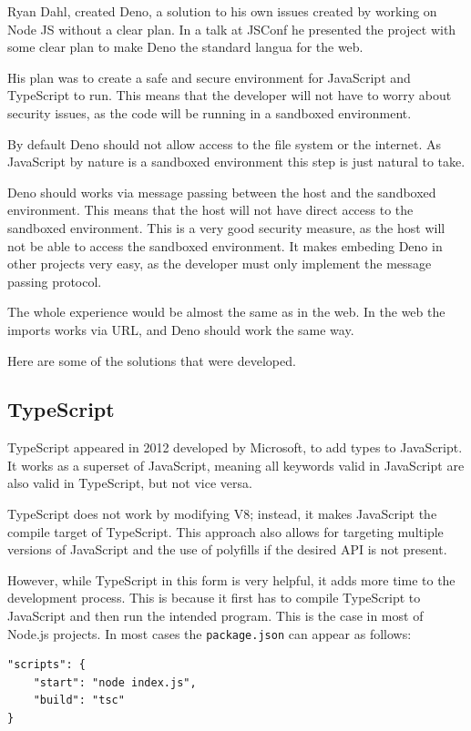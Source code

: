 \documentclass[10pt,journal,compsoc]{IEEEtran}
\begin{document}
Ryan Dahl, created Deno, a solution to his own issues created by working on Node JS without a clear plan. In a talk at JSConf he presented the project with some clear plan to make Deno the standard langua for the web.

His plan was to create a safe and secure environment for JavaScript and TypeScript to run. This means that the developer will not have to worry about security issues, as the code will be running in a sandboxed environment.

By default Deno should not allow access to the file system or the internet. As JavaScript by nature is a sandboxed environment this step is just natural to take.

Deno should works via message passing between the host and the sandboxed environment. This means that the host will not have direct access to the sandboxed environment. This is a very good security measure, as the host will not be able to access the sandboxed environment. It makes embeding Deno in other projects very easy, as the developer must only implement the message passing protocol.

The whole experience would be almost the same as in the web. In the web the imports works via URL, and Deno should work the same way.

Here are some of the solutions that were developed.

\subsection{TypeScript}

TypeScript appeared in 2012 developed by Microsoft, to add types to JavaScript. It works as a superset of JavaScript, meaning all keywords valid in JavaScript are also valid in TypeScript, but not vice versa. \cite{TypeScript}

TypeScript does not work by modifying V8; instead, it makes JavaScript the compile target of TypeScript. This approach also allows for targeting multiple versions of JavaScript and the use of polyfills \cite{Polyfill} if the desired API is not present.

However, while TypeScript in this form is very helpful, it adds more time to the development process. This is because it first has to compile TypeScript to JavaScript and then run the intended program. This is the case in most of Node.js projects. In most cases the \verb|package.json| can appear as follows:

\begin{lstlisting}
"scripts": {
    "start": "node index.js",
    "build": "tsc"
}
    \end{lstlisting}
\end{document}
